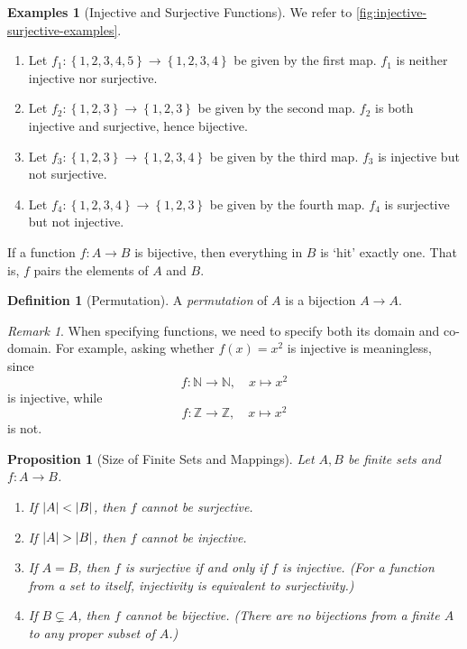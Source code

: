 \documentclass{article}
\newtheorem{proposition}[theorem]{Proposition}
\theoremstyle{definition}
\newtheorem{definition}[theorem]{Definition}
\newtheorem{examples}[theorem]{Examples}
\theoremstyle{remark}
\newtheorem{remark}[theorem]{Remark}
\DeclarePairedDelimiter{\abs}{\lvert}{\rvert}
\newcommand{\pqty}[1]{\left(#1\right)}
\newcommand{\Bqty}[1]{\left\{#1\right\}}
\newcommand{\functiondomain}[3]{#1:#2\to #3}
\newcommand{\function}[5]{#1:#2\to #3,\quad #4\mapsto #5}
\newcommand{\NN}{\mathbb{N}}
\newcommand{\ZZ}{\mathbb{Z}}
\begin{document}
\begin{examples}[Injective and Surjective Functions]
    We refer to \autoref{fig:injective-surjective-examples}.

    \begin{enumerate}
        \item Let \(\functiondomain{f_1}{\Bqty{1, 2, 3, 4, 5}}{\Bqty{1, 2, 3, 4}}\) be given by the first map. \(f_1\) is neither injective nor surjective.

        \item Let \(\functiondomain{f_2}{\Bqty{1, 2, 3}}{\Bqty{1, 2, 3}}\) be given by the second map. \(f_2\) is both injective and surjective, hence bijective.

        \item Let \(\functiondomain{f_3}{\Bqty{1, 2, 3}}{\Bqty{1, 2, 3, 4}}\) be given by the third map. \(f_3\) is injective but not surjective.

        \item Let \(\functiondomain{f_4}{\Bqty{1, 2, 3, 4}}{\Bqty{1, 2, 3}}\) be given by the fourth map. \(f_4\) is surjective but not injective.
    \end{enumerate}
\end{examples}

If a function \(\functiondomain{f}{A}{B}\) is bijective, then everything in \(B\) is `hit' exactly one. That is, \(f\) pairs the elements of \(A\) and \(B\).

\begin{definition}[Permutation]
    A \emph{permutation} of \(A\) is a bijection \(A \to A\).
\end{definition}

\begin{remark}
    When specifying functions, we need to specify both its domain and co-domain. For example, asking whether \(f\pqty{x} = x^2\) is injective is meaningless, since
    \[
        \function{f}{\NN}{\NN}{x}{x^2}
    \]
    is injective, while
    \[
        \function{f}{\ZZ}{\ZZ}{x}{x^2}
    \]
    is not.
\end{remark}

\begin{proposition}[Size of Finite Sets and Mappings]
    Let \(A, B\) be finite sets and \(\functiondomain{f}{A}{B}\).
    \begin{enumerate}
        \item If \(\abs{A} < \abs{B}\), then \(f\) cannot be surjective.
        \item If \(\abs{A} > \abs{B}\), then \(f\) cannot be injective.
        \item If \(A = B\), then \(f\) is surjective if and only if \(f\) is injective. (For a function from a set to itself, injectivity is equivalent to surjectivity.)
        \item If \(B \subsetneq A\), then \(f\) cannot be bijective. (There are no bijections from a finite \(A\) to any proper subset of \(A\).)
    \end{enumerate}
\end{proposition}
\end{document}
